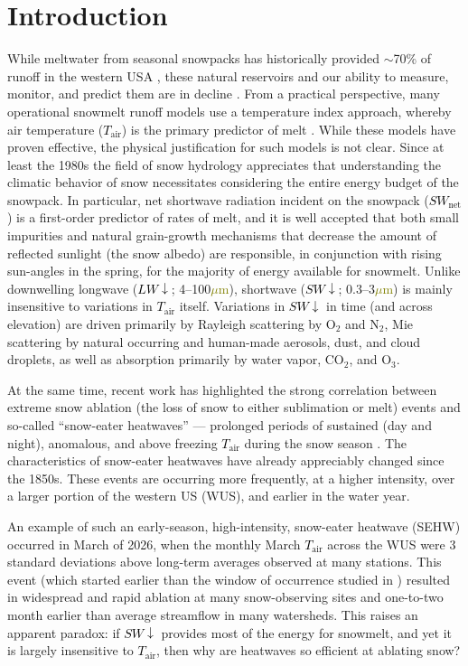\documentclass[draft]{agujournal2019}
\newcommand{\tair}{\textcolor{black}{$T_{\mathrm{air}}$}\xspace}
\newcommand{\lwdn}{\textcolor{black}{$LW\downarrow$}\xspace}
\newcommand{\swnet}{\textcolor{black}{$SW_{\mathrm{net}}$}\xspace}
\newcommand{\swdn}{\textcolor{black}{$SW\downarrow$}\xspace}
\newcommand{\um}{\textcolor{olive}{$\mu$m}\xspace}
\begin{document}
\section{Introduction}
While meltwater from seasonal snowpacks has historically provided $\sim$70\% of runoff in the western USA \cite{Li2017-dj}, these natural reservoirs and our ability to measure, monitor, and predict them are in decline \cite{Hale2023-kx, Cowherd2024-zm}.
From a practical perspective, many operational snowmelt runoff models use a temperature index approach, whereby air temperature (\tair) is the primary predictor of melt \cite{Anderson1973-jx}.
While these models have proven effective, the physical justification for such models is not clear.
Since at least the 1980s the field of snow hydrology appreciates that understanding the climatic behavior of snow necessitates considering the entire energy budget of the snowpack.
In particular, net shortwave radiation incident on the snowpack (\swnet) is a first-order predictor of rates of melt, and it is well accepted that both small impurities \cite{Deems2013-vv} and natural grain-growth mechanisms that decrease the amount of reflected sunlight (the snow albedo) are responsible, in conjunction with rising sun-angles in the spring, for the majority of energy available for snowmelt.
Unlike downwelling longwave (\lwdn; 4--100\um), shortwave (\swdn; 0.3--3\um) is mainly insensitive to variations in \tair itself.
Variations in \swdn in time (and across elevation) are driven primarily by Rayleigh scattering by O$_2$ and N$_2$, Mie scattering by natural occurring and human-made aerosols, dust, and cloud droplets, as well as absorption primarily by water vapor, CO$_2$, and O$_3$.

At the same time, recent work has highlighted the strong correlation between extreme snow ablation (the loss of snow to either sublimation or melt) events and so-called ``snow-eater heatwaves'' --- prolonged periods of sustained (day and night), anomalous, and above freezing \tair during the snow season \cite{Rhoades2026-jm}.
The characteristics of snow-eater heatwaves have already appreciably changed since the 1850s.
These events are occurring more frequently, at a higher intensity, over a larger portion of the western US (WUS), and earlier in the water year.

An example of such an early-season, high-intensity, snow-eater heatwave (SEHW) occurred in March of 2026, when the monthly March \tair across the WUS were 3 standard deviations above long-term averages observed at many stations. 
This event (which started earlier than the window of occurrence studied in ) resulted in widespread and rapid ablation at many snow-observing sites and one-to-two month earlier than average streamflow in many watersheds.
This raises an apparent paradox: if \swdn provides most of the energy for snowmelt, and yet it is largely insensitive to \tair, then why are heatwaves so efficient at ablating snow?
\end{document}
